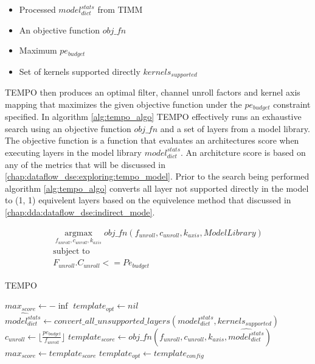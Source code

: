 \begin{itemize}
\item Processed $model^{stats}_{dict}$ from TIMM
\item An objective function $obj\_fn$
\item Maximum $pe_{budget}$ 
\item Set of kernels supported directly  $kernels_{supported}$ 
\end{itemize}

TEMPO then produces an optimal filter, channel unroll factors and kernel axis
mapping that maximizes the given objective function under the $pe_{budget}$
constraint specified. 
In algorithm \ref{alg:tempo_algo} TEMPO effectively runs an exhaustive search
using an objective function $obj\_fn$ and a set of layers from a model library.
The objective function is a function that evaluates an architectures score when
executing layers in the model library $model^{stats}_{dict}$. An architcture
score is based on any of the metrics that will be discussed in
\autoref{chap:dataflow_dse:exploring:tempo_model}. Prior to the search being
performed algorithm \ref{alg:tempo_algo} converts all layer not supported
directly in the model to (1, 1) equivelent layers based on the equivelence method
that discussed in \autoref{chap:dda:dataflow_dse:indirect_mode}.

\begin{equation}
    \begin{aligned}
        \operatorname*{argmax}_{f_{unroll}, c_{unroll}, k_{axis}} obj\_fn(f_{unroll}, c_{unroll}, k_{axis}, ModelLibrary) \\
        \text{subject to} \\
        F_{unroll}. C_{unroll} <= Pe_{budget}
    \end{aligned}
    \label{math:tempo_algo_tldr}
\end{equation}

\begin{algorithm}[H] 
    \caption{\ac{TEMPO}}
    \label{alg:tempo_algo}
    \begin{algorithmic}[1]
    \Statex 
        \State $max_{score} \gets -\inf$
        \State $template_{opt} \gets nil$
        \State $\hat{model^{stats}_{dict}} \gets convert\_all\_unsupported\_layers(model^{stats}_{dict}, kernels_{supported})$
                \State $c_{unroll} \gets \lfloor \frac{pe_{budget}}{f_{unroll}} \rfloor$ 
                \State $template_{score} \gets obj\_fn(f_{unroll}, c_{unroll}, k_{axis}, \hat{model^{stats}_{dict}})$
                    \State $max_{score} \gets template_{score}$
                    \State $template_{opt} \gets template_{config}$
                \EndIf
            \EndFor
        \EndFor
        \State {}
    \EndFunction
    \end{algorithmic}
\end{algorithm}

